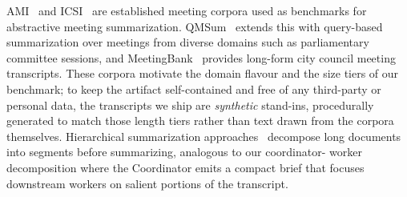 AMI~\cite{mccowan2005ami} and ICSI~\cite{janin2003icsi} are established
meeting corpora used as benchmarks for abstractive meeting summarization.
QMSum~\cite{zhong2021qmsum} extends this with query-based summarization over
meetings from diverse domains such as parliamentary committee sessions, and
MeetingBank~\cite{hu2023meetingbank} provides long-form city council meeting
transcripts.  These corpora motivate the domain flavour and the size tiers of
our benchmark; to keep the artifact self-contained and free of any third-party
or personal data, the transcripts we ship are \emph{synthetic} stand-ins,
procedurally generated to match those length tiers rather than text drawn from
the corpora themselves.  Hierarchical
summarization approaches~\cite{zhang2022hierarchical} decompose long
documents into segments before summarizing, analogous to our coordinator-
worker decomposition where the Coordinator emits a compact brief that
focuses downstream workers on salient portions of the transcript.

